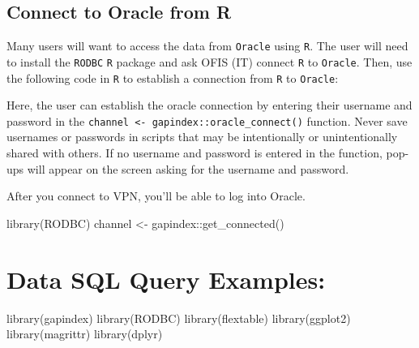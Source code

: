 \documentclass[
  letterpaper,
  oneside,
  open=any]{scrbook}
\newenvironment{Shaded}{\begin{snugshade}}{\end{snugshade}}
\newcommand{\FunctionTok}[1]{\textcolor[rgb]{0.28,0.35,0.67}{#1}}
\newcommand{\NormalTok}[1]{\textcolor[rgb]{0.00,0.23,0.31}{#1}}
\newcommand{\OtherTok}[1]{\textcolor[rgb]{0.00,0.23,0.31}{#1}}
\newcommand{\SpecialCharTok}[1]{\textcolor[rgb]{0.37,0.37,0.37}{#1}}
\begin{document}
\hypertarget{connect-to-oracle-from-r}{%
\subsection{Connect to Oracle from R}\label{connect-to-oracle-from-r}}

Many users will want to access the data from \texttt{Oracle} using
\texttt{R}. The user will need to install the \texttt{RODBC} \texttt{R}
package and ask OFIS (IT) connect \texttt{R} to \texttt{Oracle}. Then,
use the following code in \texttt{R} to establish a connection from
\texttt{R} to \texttt{Oracle}:

Here, the user can establish the oracle connection by entering their
username and password in the
\texttt{channel\ \textless{}-\ gapindex::oracle\_connect()} function.
Never save usernames or passwords in scripts that may be intentionally
or unintentionally shared with others. If no username and password is
entered in the function, pop-ups will appear on the screen asking for
the username and password.

After you connect to VPN, you'll be able to log into Oracle.

\begin{Shaded}
\begin{Highlighting}[]
\FunctionTok{library}\NormalTok{(RODBC)}
\NormalTok{channel }\OtherTok{\textless{}{-}}\NormalTok{ gapindex}\SpecialCharTok{::}\FunctionTok{get\_connected}\NormalTok{()}
\end{Highlighting}
\end{Shaded}

\hypertarget{data-sql-query-examples}{%
\section*{Data SQL Query Examples:}\label{data-sql-query-examples}}


\begin{Shaded}
\begin{Highlighting}[]
\FunctionTok{library}\NormalTok{(gapindex)}
\FunctionTok{library}\NormalTok{(RODBC)}
\FunctionTok{library}\NormalTok{(flextable)}
\FunctionTok{library}\NormalTok{(ggplot2)}
\FunctionTok{library}\NormalTok{(magrittr)}
\FunctionTok{library}\NormalTok{(dplyr)}
\end{Highlighting}
\end{Shaded}
\end{document}
